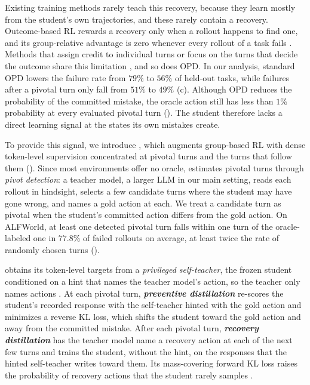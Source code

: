 \documentclass[10pt, logo, onecolumn, copyright]{nv}
\begin{document}
Existing training methods rarely teach this recovery, because they learn mostly from the student's own trajectories, and these rarely contain a recovery. Outcome-based RL rewards a recovery only when a rollout happens to find one, and its group-relative advantage is zero whenever every rollout of a task fails \citep{shao2024deepseekmath}. Methods that assign credit to individual turns or focus on the turns that decide the outcome share this limitation \citep{feng2025gigpo,yi2026pivotrl,yang2026opid}, and so does OPD. In our analysis, standard OPD lowers the failure rate from $79\%$ to $56\%$ of held-out tasks, while failures after a pivotal turn only fall from $51\%$ to $49\%$ (c). Although OPD reduces the probability of the committed mistake, the oracle action still has less than $1\%$ probability at every evaluated pivotal turn (). The student therefore lacks a direct learning signal at the states its own mistakes create.

To provide this signal, we introduce \textbf{\method{}}, which augments group-based RL with dense token-level supervision concentrated at pivotal turns and the turns that follow them (). Since most environments offer no oracle, \method{} estimates pivotal turns through \emph{pivot detection}: a teacher model, a larger LLM in our main setting, reads each rollout in hindsight, selects a few candidate turns where the student may have gone wrong, and names a gold action at each. We treat a candidate turn as pivotal when the student's committed action differs from the gold action. On ALFWorld, at least one detected pivotal turn falls within one turn of the oracle-labeled one in $77.8\%$ of failed rollouts on average, at least twice the rate of randomly chosen turns ().

\method{} obtains its token-level targets from a \emph{privileged self-teacher}, the frozen student conditioned on a hint that names the teacher model's action, so the teacher only names actions \citep{zhao2026opsd,penaloza2026pid}. At each pivotal turn, \textbf{\emph{preventive distillation}} re-scores the student's recorded response with the self-teacher hinted with the gold action and minimizes a reverse KL loss, which shifts the student toward the gold action and away from the committed mistake. After each pivotal turn, \textbf{\emph{recovery distillation}} has the teacher model name a recovery action at each of the next few turns and trains the student, without the hint, on the responses that the hinted self-teacher writes toward them. Its mass-covering forward KL loss raises the probability of recovery actions that the student rarely samples \citep{kim2016sequence}.
\end{document}
